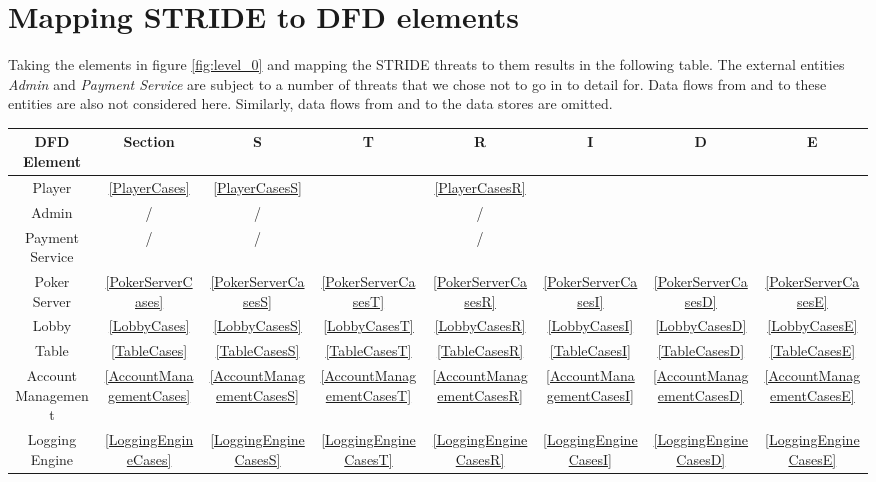 \documentclass[a4paper,11pt]{report}
\begin{document}
\section{Mapping STRIDE to DFD elements}

Taking the elements in figure \ref{fig:level_0} and mapping the STRIDE threats to them results in the following table. The external entities \textit{Admin} and \textit{Payment Service} are subject to a number of threats that we chose not to go in to detail for. Data flows from and to these entities are also not considered here. Similarly, data flows from and to the data stores are omitted.

\vspace{0.3cm}
\begin{center}
\begin{tabular}{| c || c || c | c | c | c | c | c |}
  \hline
  \textbf{DFD Element} 	& \textbf{Section}		& \textbf{S} 	& \textbf{T} 	& \textbf{R} 	& \textbf{I} 	& \textbf{D} 	& \textbf{E}	\\\hline
  \hline
  Player 		& \ref{PlayerCases}		& \ref{PlayerCasesS} 	& 	& \ref{PlayerCasesR} 		&  		&  		& 		\\\hline
  Admin 		& /			& / 		& 		& / 		&  		&  		& 		\\\hline
  Payment Service 	& /			& / 		& 		& / 		&  		&  		& 		\\\hline
  \hline
  Poker Server 		& \ref{PokerServerCases}	& \ref{PokerServerCasesS} 	& \ref{PokerServerCasesT}	& \ref{PokerServerCasesR} 	& \ref{PokerServerCasesI} 	& \ref{PokerServerCasesD} 	& \ref{PokerServerCasesE}	\\\hline
  Lobby 		& \ref{LobbyCases}		& \ref{LobbyCasesS} 	& \ref{LobbyCasesT}	& \ref{LobbyCasesR} 	& \ref{LobbyCasesI} 	& \ref{LobbyCasesD} 	& \ref{LobbyCasesE}	\\\hline
  Table 		& \ref{TableCases}		& \ref{TableCasesS} 	& \ref{TableCasesT}	& \ref{TableCasesR} 	& \ref{TableCasesI} 	& \ref{TableCasesD} 	& \ref{TableCasesE}	\\\hline
  Account Management 	& \ref{AccountManagementCases} 	& \ref{AccountManagementCasesS} 	& \ref{AccountManagementCasesT}	& \ref{AccountManagementCasesR} 	& \ref{AccountManagementCasesI} 	& \ref{AccountManagementCasesD} 	& \ref{AccountManagementCasesE}	\\\hline
  Logging Engine 	& \ref{LoggingEngineCases}	& \ref{LoggingEngineCasesS} 	& \ref{LoggingEngineCasesT}	& \ref{LoggingEngineCasesR} 	& \ref{LoggingEngineCasesI} 	& \ref{LoggingEngineCasesD} 	& \ref{LoggingEngineCasesE}	\\\hline

\end{tabular}
\end{center}
\end{document}
